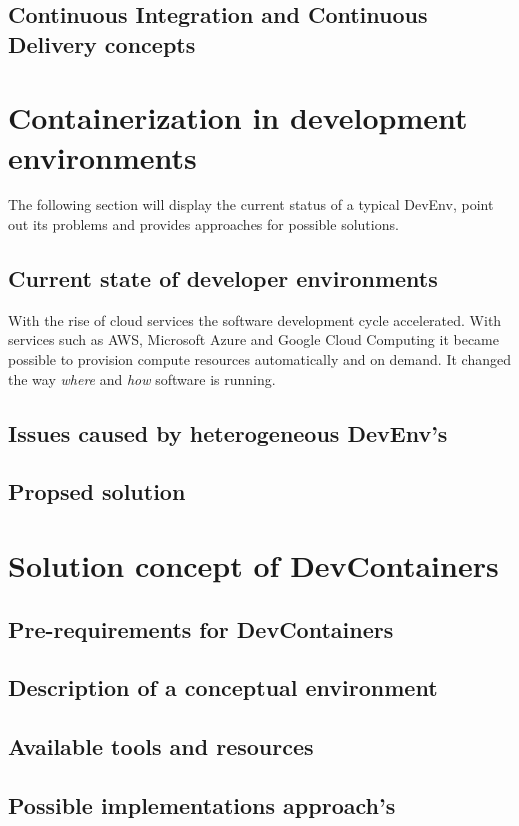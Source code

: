 \documentclass[12pt, a4paper]{article}
\begin{document}
    \subsection{Continuous Integration and Continuous Delivery concepts}

    \section{Containerization in development environments}
The following section will display the current status of a typical \ac{DevEnv}, point out its problems and provides approaches for possible solutions.
    \subsection{Current state of developer environments}
    With the rise of cloud services the software development cycle accelerated. With services such as \ac{AWS}, Microsoft Azure and Google Cloud Computing it became possible to provision compute resources automatically and on demand. It changed the way \textit{where} and \textit{how} software is running.\newline
    \subsection{Issues caused by heterogeneous \acs{DevEnv}'s}
    \subsection{Propsed solution}
\section{Solution concept of DevContainers}
    \subsection{Pre-requirements for DevContainers}
    \subsection{Description of a conceptual environment}
    \subsection{Available tools and resources}
    \subsection{Possible implementations approach's}
\end{document}
